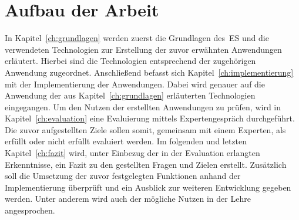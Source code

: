 \section{Aufbau der Arbeit}\label{sec:aufbau-der-arbeit}
In Kapitel~\ref{ch:grundlagen} werden zuerst die Grundlagen des~\ac{ES} und die verwendeten Technologien
zur Erstellung der zuvor erwähnten Anwendungen erläutert.
Hierbei sind die Technologien entsprechend der zugehörigen Anwendung zugeordnet.
Anschließend befasst sich Kapitel~\ref{ch:implementierung} mit der Implementierung der Anwendungen.
Dabei wird genauer auf die Anwendung der aus Kapitel~\ref{ch:grundlagen} erläuterten Technologien eingegangen.
Um den Nutzen der erstellten Anwendungen zu prüfen, wird in Kapitel~\ref{ch:evaluation} eine Evaluierung mittels Expertengespräch durchgeführt.
Die zuvor aufgestellten Ziele sollen somit, gemeinsam mit einem Experten, als erfüllt oder nicht erfüllt evaluiert werden.
Im folgenden und letzten Kapitel~\ref{ch:fazit} wird, unter Einbezug der in der Evaluation erlangten Erkenntnisse, ein Fazit zu den gestellten Fragen und Zielen erstellt.
Zusätzlich soll die Umsetzung der zuvor festgelegten Funktionen anhand der Implementierung überprüft und ein Ausblick zur weiteren Entwicklung gegeben werden.
Unter anderem wird auch der mögliche Nutzen in der Lehre angesprochen.
